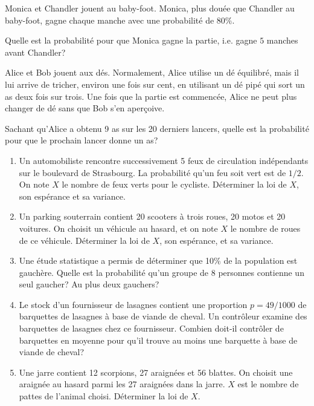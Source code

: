 \documentclass{yann}
\begin{document}
\Exercice

Monica et Chandler jouent au baby-foot.
Monica, plus douée que Chandler au baby-foot,
gagne chaque manche avec une probabilité de $80\%$.

Quelle est la probabilité pour que Monica gagne la partie, i.e.
gagne $5$ manches avant Chandler?

\Exercice

Alice et Bob jouent aux dés.
Normalement, Alice utilise un dé équilibré, mais il lui arrive de tricher,
environ une fois sur cent, en utilisant un dé pipé qui sort un as deux fois
sur trois. Une fois que la partie est commencée, Alice ne peut plus
changer de dé sans que Bob s'en aperçoive.

Sachant qu'Alice a obtenu 9 as sur les 20 derniers lancers, quelle est la
probabilité pour que le prochain lancer donne un as?


\begin{enumerate}
\item
  Un automobiliste rencontre successivement 5 feux de circulation indépendants sur le boulevard de Strasbourg.
  La probabilité qu'un feu soit vert est de $1/2$.
  On note $X$ le nombre de feux verts pour le cycliste.
  Déterminer la loi de $X$, son espérance et sa variance.
\item
  Un parking souterrain contient 20 scooters à trois roues, 20 motos et 20 voitures.
  On choisit un véhicule au hasard, et on note $X$ le nombre de roues de ce véhicule.
  Déterminer la loi de $X$, son espérance, et sa variance.
\item
  Une étude statistique a permis de déterminer que 10\% de la population est gauchère.
  Quelle est la probabilité qu'un groupe de 8 personnes contienne un seul gaucher?
  Au plus deux gauchers?
\item
  Le stock d'un fournisseur de lasagnes contient une proportion $p = 49/1000$
  de barquettes de lasagnes à base de viande de cheval.
  Un contrôleur examine des barquettes de lasagnes chez ce fournisseur.
  Combien doit-il contrôler de barquettes en moyenne pour qu'il trouve au moins une barquette à base de viande de cheval?
\item
  Une jarre contient 12 scorpions, 27 araignées et 56 blattes.
  On choisit une araignée au hasard parmi les 27 araignées dans la jarre.
  $X$ est le nombre de pattes de l'animal choisi.
  Déterminer la loi de $X$.
\end{enumerate}
\end{document}

